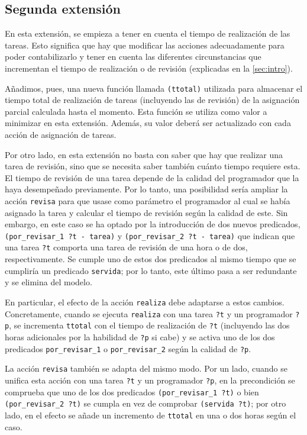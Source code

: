
\subsection{Segunda extensión} \label{sec:mod-ext2}

En esta extensión, se empieza a tener en cuenta el tiempo de realización de 
las tareas. Esto significa que hay que modificar las acciones adecuadamente 
para poder contabilizarlo y tener en cuenta las diferentes circunstancias que 
incrementan el tiempo de realización o de revisión (explicadas en la 
\autoref{sec:intro}).

Añadimos, pues, una nueva función llamada \texttt{(ttotal)} utilizada para 
almacenar el tiempo total de realización de tareas (incluyendo las de 
revisión) de la asignación parcial calculada hasta el momento. Esta función 
se utiliza como valor a minimizar en esta extensión. Además, su valor deberá 
ser actualizado con cada acción de asignación de tareas.

Por otro lado, en esta extensión no basta con saber que hay que realizar una 
tarea de revisión, sino que se necesita saber también cuánto tiempo requiere 
esta. El tiempo de revisión de una tarea depende de la calidad del programador 
que la haya desempeñado previamente. Por lo tanto, una posibilidad sería 
ampliar la acción \texttt{revisa} para que usase como parámetro el programador 
al cual se había asignado la tarea y calcular el tiempo de revisión según la 
calidad de este. Sin embargo, en este caso se ha optado por la introducción de 
dos nuevos predicados, \texttt{(por\_revisar\_1 ?t - tarea)} y 
\texttt{(por\_revisar\_2 ?t - tarea)} que indican que una tarea \texttt{?t} 
comporta una tarea de revisión de una hora o de dos, respectivamente. Se 
cumple uno de estos dos predicados al mismo tiempo que se cumpliría un 
predicado  \texttt{servida}; por lo tanto, este último pasa a ser redundante 
y se elimina del modelo.

En particular, el efecto de la acción \texttt{realiza} debe adaptarse a estos 
cambios. Concretamente, cuando se ejecuta \texttt{realiza} con una tarea 
\texttt{?t} y un programador \texttt{?p}, se incrementa \texttt{ttotal} con 
el tiempo de realización de \texttt{?t} (incluyendo las dos horas adicionales 
por la habilidad de \texttt{?p} si cabe) y se activa uno de los dos predicados 
\texttt{por\_revisar\_1} o \texttt{por\_revisar\_2} según la calidad de 
\texttt{?p}.

La acción \texttt{revisa} también se adapta del mismo modo. Por un lado, 
cuando se unifica esta acción con una tarea \texttt{?t} y un programador 
\texttt{?p}, en la precondición se comprueba que uno de los dos predicados 
\texttt{(por\_revisar\_1 ?t)} o bien \texttt{(por\_revisar\_2 ?t)} se cumpla 
en vez de comprobar \texttt{(servida ?t)}; por otro lado, en el efecto se 
añade un incremento de \texttt{ttotal} en una o dos horas según el caso.




